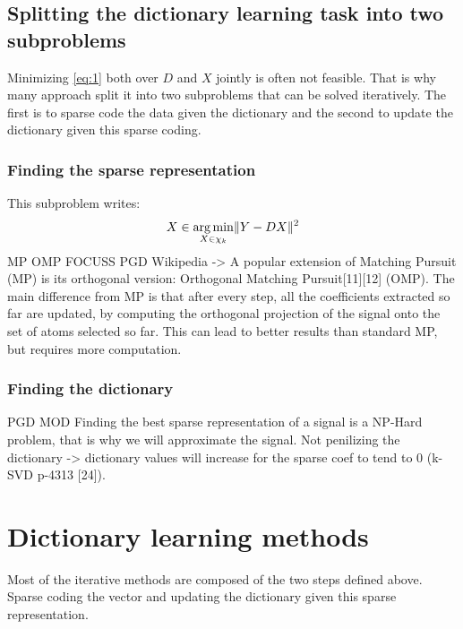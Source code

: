 \documentclass[a4paper,11pt]{article}
\DeclarePairedDelimiter\norm{\lVert}{\rVert} %
\DeclareMathOperator*{\argmin}{arg\,min} %
\begin{document}
\subsection{Splitting the dictionary learning task into two subproblems}
Minimizing \ref{eq:1} both over $D$ and $X$ jointly is often not feasible.
That is why many approach split it into two subproblems that can be solved iteratively.
The first is to sparse code the data given the dictionary and the second to update the dictionary given this sparse coding.

\subsubsection{Finding the sparse representation}
This subproblem writes:
\begin{equation} \label{eq:1}
X \in \argmin_{X \in \chi_k} \norm{Y - DX}^2
\end{equation}
MP OMP FOCUSS \cite{gorodnitsky97} PGD
Wikipedia -> A popular extension of Matching Pursuit (MP) is its orthogonal version: Orthogonal Matching Pursuit[11][12] (OMP). The main difference from MP is that after every step, all the coefficients extracted so far are updated, by computing the orthogonal projection of the signal onto the set of atoms selected so far. This can lead to better results than standard MP, but requires more computation.
\subsubsection{Finding the dictionary}
PGD MOD
Finding the best sparse representation of a signal is a NP-Hard problem, that is why we will approximate the signal.
Not penilizing the dictionary -> dictionary values will increase for the sparse coef to tend to 0
\cite{olshausen97} (k-SVD p-4313 [24]).
\section{Dictionary learning methods}
Most of the iterative methods are composed of the two steps defined above.
Sparse coding the vector and updating the dictionary given this sparse representation.
\end{document}

